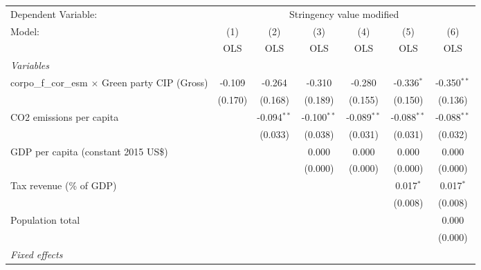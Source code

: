 
\begingroup
\centering
\begin{tabular}{lcccccc}
   \toprule
   Dependent Variable: & \multicolumn{6}{c}{Stringency value modified}\\
   Model:                                                  & (1)     & (2)           & (3)           & (4)           & (5)           & (6)\\  
                                                           &  OLS    & OLS           & OLS           & OLS           & OLS           & OLS\\  
   \midrule
   \emph{Variables}\\
   corpo\_f\_cor\_esm $\times$ Green party CIP (Gross)     & -0.109  & -0.264        & -0.310        & -0.280        & -0.336$^{*}$  & -0.350$^{**}$\\   
                                                           & (0.170) & (0.168)       & (0.189)       & (0.155)       & (0.150)       & (0.136)\\   
   CO2 emissions per capita                                &         & -0.094$^{**}$ & -0.100$^{**}$ & -0.089$^{**}$ & -0.088$^{**}$ & -0.088$^{**}$\\   
                                                           &         & (0.033)       & (0.038)       & (0.031)       & (0.031)       & (0.032)\\   
   GDP per capita (constant 2015 US\$)                     &         &               & 0.000         & 0.000         & 0.000         & 0.000\\   
                                                           &         &               & (0.000)       & (0.000)       & (0.000)       & (0.000)\\   
   Tax revenue (\% of GDP)                                 &         &               &               &               & 0.017$^{*}$   & 0.017$^{*}$\\   
                                                           &         &               &               &               & (0.008)       & (0.008)\\   
   Population total                                        &         &               &               &               &               & 0.000\\   
                                                           &         &               &               &               &               & (0.000)\\   
   \emph{Fixed effects}\\

\end{tabular}
